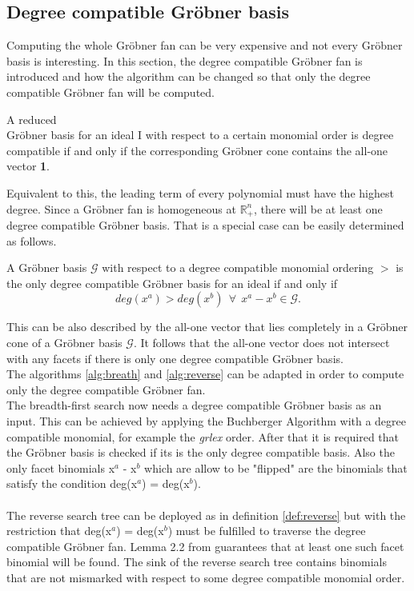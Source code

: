 \subsection{Degree compatible Gröbner basis}
\label{subsec:degreecomp}
Computing the whole Gröbner fan can be very expensive and not every Gröbner basis is interesting.
In this section, the degree compatible Gröbner fan is introduced and how the algorithm can
be changed so that only the degree compatible Gröbner fan will be computed.\\
\begin{env_definition}
\cite{dueckpaper}
A reduced \\ Gröbner basis for an ideal I with respect to a certain monomial order is
degree compatible if and only if the corresponding Gröbner cone contains the all-one vector \textbf{1}.
\end{env_definition}
Equivalent to this, the leading term of every polynomial must have the highest degree.
Since a Gröbner fan is homogeneous at $\mathbb{R}^{n}_{+}$, there will be at least one degree compatible Gröbner basis.
That is a special case can be easily determined as follows.

\begin{env_definition}
\cite{dueckpaper}
A Gröbner basis $\mathcal{G}$ with respect to a degree compatible monomial ordering $>$  is the only degree compatible Gröbner basis for an ideal if and only if
\[ deg(x^{a}) > deg(x^{b})~~ \forall~~ x^{a}-x^{b}\in \mathcal{G}. \] 
\end{env_definition}

This can be also described by the all-one vector that lies completely in a Gröbner cone of a Gröbner basis $\mathcal{G}$.
It follows that the all-one vector does not intersect with any facets if there is only one degree compatible Gröbner basis. \\

The algorithms \ref{alg:breath} and \ref{alg:reverse} can be adapted in order to compute only the degree compatible Gröbner fan.\\ 
The breadth-first search now needs a degree compatible Gröbner basis as an input. This can be achieved by applying the Buchberger Algorithm with a degree compatible monomial, for example the \textit{grlex} order. After that it is required that the Gröbner basis is checked if its is the only degree compatible basis. %
Also the only facet binomials x$^{a}$ - x$^{b}$ which are allow to be "flipped" are the binomials that satisfy the condition
deg(x$^{a}$) = deg(x$^{b}$). \\ \\
The reverse search tree can be deployed as in definition \ref{def:reverse} but with the restriction that deg(x$^{a}$) = deg(x$^{b}$) must be fulfilled to traverse the degree compatible Gröbner fan.
Lemma 2.2 from \cite{dueckpaper} guarantees that at least one such facet binomial will be found. 
The sink of the reverse search tree contains binomials that are not mismarked with respect to some degree compatible monomial order. 

